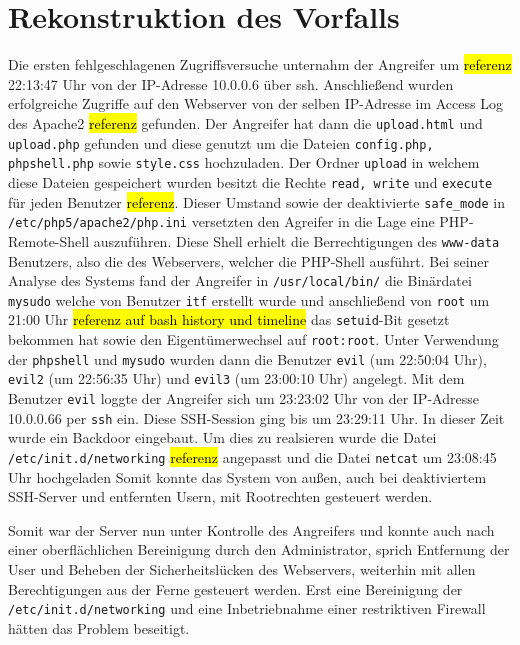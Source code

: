 \section{Rekonstruktion des Vorfalls}
Die ersten fehlgeschlagenen Zugriffsversuche unternahm der Angreifer um \hl{referenz} 22:13:47 Uhr von der IP-Adresse 10.0.0.6 über ssh.
Anschließend wurden erfolgreiche Zugriffe auf den Webserver von der selben IP-Adresse im Access Log des Apache2 \hl{referenz} gefunden.
Der Angreifer hat dann die \texttt{upload.html} und \texttt{upload.php} gefunden und diese genutzt um die Dateien \texttt{config.php, phpshell.php} sowie \texttt{style.css} hochzuladen. Der Ordner \texttt{upload} in welchem diese Dateien gespeichert wurden besitzt die Rechte \texttt{read, write} und \texttt{execute} für jeden Benutzer \hl{referenz}. 
Dieser Umstand sowie der deaktivierte \texttt{safe\_mode} in \texttt{/etc/php5/apache2/php.ini} versetzten den Agreifer in die Lage eine PHP-Remote-Shell auszuführen.
Diese Shell erhielt die Berrechtigungen des \texttt{www-data} Benutzers, also die des Webservers, welcher die PHP-Shell ausführt.
Bei seiner Analyse des Systems fand der Angreifer in \texttt{/usr/local/bin/} die Binärdatei \texttt{mysudo} welche von Benutzer \texttt{itf} erstellt wurde und anschließend von \texttt{root} um 21:00 Uhr \hl{referenz auf bash history und timeline} das \texttt{setuid}-Bit gesetzt bekommen hat sowie den Eigentümerwechsel auf \texttt{root:root}.
Unter Verwendung der \texttt{phpshell} und \texttt{mysudo} wurden dann die Benutzer \texttt{evil} (um 22:50:04 Uhr), \texttt{evil2} (um 22:56:35 Uhr) und \texttt{evil3} (um 23:00:10 Uhr) angelegt. Mit dem Benutzer \texttt{evil} loggte der Angreifer sich um 23:23:02 Uhr von der IP-Adresse 10.0.0.66 per \texttt{ssh} ein. Diese SSH-Session ging bis um 23:29:11 Uhr. In dieser Zeit wurde ein Backdoor eingebaut. Um dies zu realsieren wurde die Datei \texttt{/etc/init.d/networking} \hl{referenz} angepasst und die Datei \texttt{netcat} um 23:08:45 Uhr hochgeladen Somit konnte das System von außen, auch bei deaktiviertem SSH-Server und entfernten Usern, mit Rootrechten gesteuert werden.

Somit war der Server nun unter Kontrolle des Angreifers und konnte auch nach einer oberflächlichen Bereinigung durch den Administrator, sprich Entfernung der User und Beheben der Sicherheitslücken des Webservers, weiterhin mit allen Berechtigungen aus der Ferne gesteuert werden. Erst eine Bereinigung der \texttt{/etc/init.d/networking} und eine Inbetriebnahme einer restriktiven Firewall hätten das Problem beseitigt.